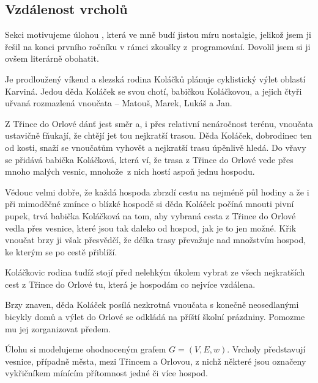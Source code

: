 \subsection{Vzdálenost vrcholů}
\label{ssec:vzdalenost-vrcholu}

Sekci motivujeme úlohou , která ve mně budí jistou míru
nostalgie, jelikož jsem ji řešil na konci prvního ročníku v rámci zkoušky
z~programování. Dovolil jsem si ji ovšem literárně obohatit.

\begin{problem}
 \label{prob:rodinny-vylet}
 Je prodloužený víkend a slezská rodina Koláčků plánuje cyklistický výlet
 oblastí Karviná. Jedou děda Koláček se svou chotí, babičkou Koláčkovou, a
 jejich čtyři uřvaná rozmazlená vnoučata -- Matouš, Marek, Lukáš a Jan.

 Z Třince do Orlové dánť jest směr a, i přes relativní nenáročnost terénu,
 vnoučata ustavičně fňukají, že chtějí jet tou nejkratší trasou. Děda Koláček,
 dobrodinec ten od kosti, snaží se vnoučatům vyhovět a nejkratší trasu úpěnlivě
 hledá. Do vřavy se přidává babička Koláčková, která ví, že trasa z Třince do
 Orlové vede přes mnoho malých vesnic, mnohože~z nich hostí aspoň jednu hospodu.

 Vědouc velmi dobře, že každá hospoda zbrzdí cestu na nejméně půl hodiny a že i
 při mimoděčné zmínce o blízké hospodě si děda Koláček počíná mnouti pivní
 pupek, trvá babička Koláčková na tom, aby vybraná cesta z Třince do Orlové
 vedla přes vesnice, které jsou tak daleko od hospod, jak je to jen možné. Křik
 vnoučat brzy ji však přesvědčí, že délka trasy převažuje nad množstvím hospod,
 ke kterým se po cestě přiblíží.

 Koláčkovic rodina tudíž stojí před nelehkým úkolem vybrat ze všech nejkratších
 cest z Třince do Orlové tu, která je hospodám co nejvíce vzdálena.

 Brzy znaven, děda Koláček posílá nezkrotná vnoučata s konečně neosedlanými
 bicykly domů a výlet do Orlové se odkládá na příští školní prázdniny. Pomozme
 mu jej zorganizovat předem.
\end{problem}

Úlohu si modelujeme ohodnoceným grafem $G = (V,E,w)$. Vrcholy představují
vesnice, případně města, mezi Třincem a Orlovou, z nichž některé jsou označeny
vykřičníkem mínícím přítomnost jedné či více hospod.

